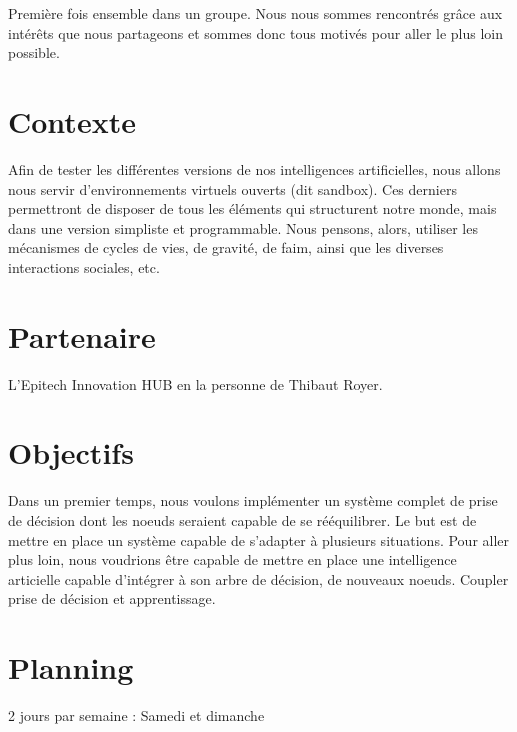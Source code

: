 \documentclass[a4paper]{report}
\begin{document}
  \noindent
  Première fois ensemble dans un groupe. Nous nous sommes rencontrés grâce aux
  intérêts que nous partageons et sommes donc tous motivés pour aller le plus
  loin possible.

  \section*{Contexte}
  Afin de tester les différentes versions de nos intelligences artificielles, nous allons nous servir d'environnements virtuels ouverts (dit sandbox).
  Ces derniers permettront de disposer de tous les éléments qui structurent notre monde, mais dans une version simpliste et programmable.
  Nous pensons, alors, utiliser les mécanismes de cycles de vies, de gravité, de faim, ainsi que les diverses interactions sociales, etc.

  \section*{Partenaire}

  L'Epitech Innovation HUB en la personne de Thibaut Royer.

  \section*{Objectifs}
  Dans un premier temps, nous voulons implémenter un système complet de prise de décision dont les noeuds seraient capable de se rééquilibrer. Le but est
  de mettre en place un système capable de s'adapter à plusieurs situations. Pour aller plus loin, nous voudrions être capable de mettre en place
  une intelligence articielle capable d'intégrer à son arbre de décision, de nouveaux noeuds.
  Coupler prise de décision et apprentissage.

  \section*{Planning}
  2 jours par semaine : Samedi et dimanche
\end{document}

